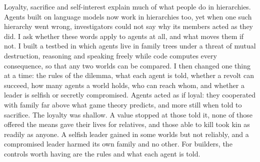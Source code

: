 Loyalty, sacrifice and self-interest explain much of what people do in hierarchies. Agents built on language models now work in hierarchies too, yet when one such hierarchy went wrong, investigators could not say why its members acted as they did. I ask whether these words apply to agents at all, and what moves them if not. I built a testbed in which agents live in family trees under a threat of mutual destruction, reasoning and speaking freely while code computes every consequence, so that any two worlds can be compared. I then changed one thing at a time: the rules of the dilemma, what each agent is told, whether a revolt can succeed, how many agents a world holds, who can reach whom, and whether a leader is selfish or secretly compromised. Agents acted as if loyal: they cooperated with family far above what game theory predicts, and more still when told to sacrifice. The loyalty was shallow. A value stopped at those told it, none of those offered the means gave their lives for relatives, and those able to kill took kin as readily as anyone. A selfish leader gained in some worlds but not reliably, and a compromised leader harmed its own family and no other. For builders, the controls worth having are the rules and what each agent is told.
